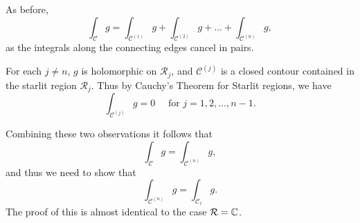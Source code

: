 \begin{blankbox}
As before,
\[
\int_{\mathcal{C}} g = \int_{\mathcal{C}^{(1)}} g + \int_{\mathcal{C}^{(2)}} g + \ldots + \int_{\mathcal{C}^{(n)}} g,
\]
as the integrals along the connecting edges cancel in pairs.
\begin{comment}
\leftimage{
\texttt{[image: ch5\_deformation2\_full]}
}
{
The edge where $\mathcal{C}^{(j)}$ and $\mathcal{C}^{(j+1)}$ intersect is traversed in one direction along $\mathcal{C}^{(j)}$ and in the opposite direction along $\mathcal{C}^{(j+1)}$.  Thus when we compute the sum of the integral of $g$ along $\mathcal{C}^{(j)}$ and along $\mathcal{C}^{(j+1)}$, the contributions made by this connecting edge cancel.
}
\end{comment}

For each $j \neq n$, $g$ is holomorphic on $\mathcal{R}_j$, and $\mathcal{C}^{(j)}$ is a closed contour contained in the starlit region $\mathcal{R}_j$.  Thus by Cauchy's Theorem for Starlit regions, we have
\[
\int_{\mathcal{C}^{(j)}} g = 0\quad \text{ for } j=1,2,\ldots,n-1.
\]

Combining these two observations it follows that
\[
\int_{\mathcal{C}} g = \int_{\mathcal{C}^{(n)}} g,
\]
and thus we need to show that
\[
\int_{\mathcal{C}^{(n)}}g = \int_{\mathcal{C}_r} g.
\]
The proof of this is almost identical to the case $\mathcal{R}=\mathbb{C}$.
\end{blankbox}
